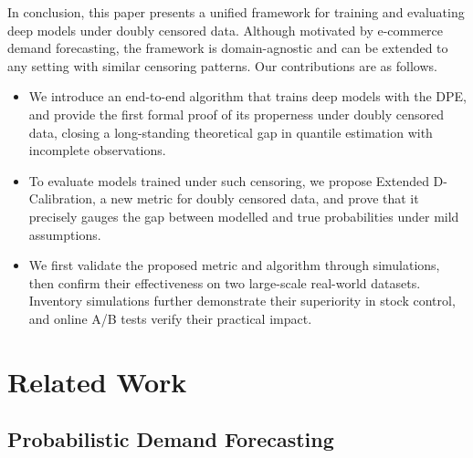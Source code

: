 \documentclass[sigconf]{acmart}
\begin{document}
In conclusion, this paper presents a unified framework for training and evaluating deep models under doubly censored data. Although motivated by e-commerce demand forecasting, the framework is domain-agnostic and can be extended to any setting with similar censoring patterns. Our contributions are as follows.
\begin{itemize}
    \item We introduce an end-to-end algorithm that trains deep models with the DPE, and provide the first formal proof of its properness under doubly censored data, closing a long-standing theoretical gap in quantile estimation with incomplete observations.
    \item To evaluate models trained under such censoring, we propose Extended D-Calibration, a new metric for doubly censored data, and prove that it precisely gauges the gap between modelled and true probabilities under mild assumptions.
    \item We first validate the proposed metric and algorithm through simulations, then confirm their effectiveness on two large-scale real-world datasets. Inventory simulations further demonstrate their superiority in stock control, and online A/B tests verify their practical impact.
\end{itemize}

\section{Related Work}

\subsection{Probabilistic Demand Forecasting}
\end{document}
